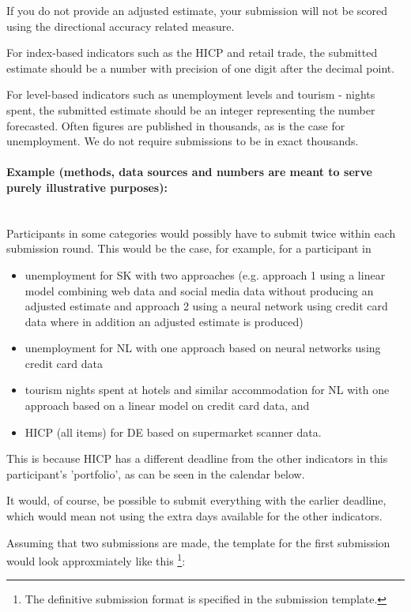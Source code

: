 \documentclass[12pt]{article}
\begin{document}
If you do not provide an adjusted estimate, your submission will not be scored using the directional accuracy related measure.

For index-based indicators such as the HICP and retail trade, the submitted estimate should be a number with precision of one digit after the decimal point. 

For level-based indicators such as unemployment levels and tourism - nights spent, the submitted estimate should be an integer representing the number forecasted. Often figures are published in thousands, as is the case for unemployment. We do not require submissions to be in exact thousands.

\paragraph{Example (methods, data sources and numbers are meant to serve purely illustrative purposes):}

\textbf{ }\\
 Participants in some categories would possibly have to submit twice within each submission round. This would be the case, for example, for a participant in 

\begin{itemize}
 \item{unemployment for SK with two approaches (e.g. approach 1 using a linear model combining web data and social media data without producing an adjusted estimate and approach 2 using a neural network using credit card data where in addition an adjusted estimate is produced)}
 \item{unemployment for NL with one approach based on neural networks using credit card data}
 \item{tourism nights spent at hotels and similar accommodation for NL with one approach based on a linear model on credit card data, and}
 \item{HICP (all items) for DE based on supermarket scanner data.}
\end{itemize}

This is because HICP has a different deadline from the other indicators in this participant's 'portfolio', as can be seen in the calendar below. 

It would, of course, be possible to submit everything with the earlier deadline, which would mean not using the extra days available for the other indicators. 

Assuming that two submissions are made, the template for the first submission would look approxmiately like this \footnote{The definitive submission format is specified in the submission template.}:
\end{document}
